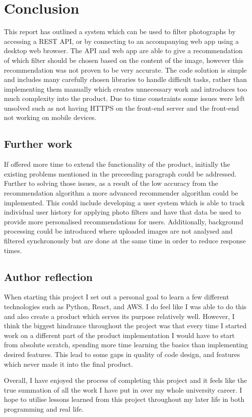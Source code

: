 \documentclass[a4paper,12pt]{report}
\begin{document}
\chapter{Conclusion}
  This report has outlined a system which can be used to filter photographs by accessing a REST API, or by connecting to an accompanying web app using a desktop web browser. The API and web app are able to give a recommendation of which filter should be chosen based on the content of the image, however this recommendation was not proven to be very accurate. The code solution is simple and includes many carefully chosen libraries to handle difficult tasks, rather than implementing them manually which creates unnecessary work and introduces too much complexity into the product. Due to time constraints some issues were left unsolved such as not having HTTPS on the front-end server and the front-end not working on mobile devices.

  \newpage
  \section{Further work}
    If offered more time to extend the functionality of the product, initially the existing problems mentioned in the preceeding paragraph could be addressed. Further to solving those issues, as a result of the low accuracy from the recommendation algorithm a more advanced recommender algorithm could be implemented. This could include developing a user system which is able to track individual user history for applying photo filters and have that data be used to provide more personalised recommendations for users. Additionally, background processing could be introduced where uploaded images are not analysed and filtered synchronously but are done at the same time in order to reduce response times.

  \section{Author reflection}
    When starting this project I set out a personal goal to learn a few different technologies such as Python, React, and AWS. I do feel like I was able to do this and also create a product which serves its purpose relatively well. However, I think the biggest hindrance throughout the project was that every time I started work on a different part of the product implementation I would have to start from absolute scratch, spending more time learning the basics than implementing desired features. This lead to some gaps in quality of code design, and features which never made it into the final product.

    Overall, I have enjoyed the process of completing this project and it feels like the true summation of all the work I have put in over my whole university career. I hope to utilise lessons learned from this project throughout my later life in both programming and real life.

\newpage
\singlespacing



\end{document}
